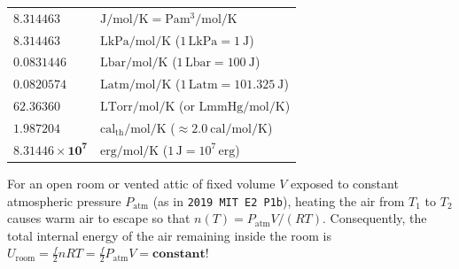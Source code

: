 \begin{twocol}[0.51]
\begin{shortcut}
\begin{tabularx}{\linewidth}{@{}l X@{}}
$\mathbf{8.314463}$ & $\si{\joule\per\mole\per\kelvin} = \si{\pascal\cubic\meter\per\mole\per\kelvin}$ \\
$\mathbf{8.314463}$ & $\si{\liter\kilo\pascal\per\mole\per\kelvin}$ ($1\,\si{\liter\kilo\pascal} = \SI{1}{\joule}$) \\
$\mathbf{0.0831446}$ & $\si{\liter\bar\per\mole\per\kelvin}$ ($1\,\si{\liter\bar} = \SI{100}{\joule}$) \\
$\mathbf{0.0820574}$ & $\si{\liter\text{atm}\per\mole\per\kelvin}$ ($1\,\si{\liter\text{atm}} = \SI{101.325}{\joule}$) \\
$\mathbf{62.36360}$ & $\si{\liter\text{Torr}\per\mole\per\kelvin}$ (or $\si{\liter\milli\meter\text{Hg}\per\mole\per\kelvin}$) \\
$\mathbf{1.987204}$ & $\si{\text{cal}_{\mathrm{th}}\per\mole\per\kelvin}$ ($\approx \SI{2.0}{\text{cal}\per\mole\per\kelvin}$) \\
$\mathbf{8.31446\times 10^7}$ & $\si{\text{erg}\per\mole\per\kelvin}$ ($1\,\si{\joule} = 10^7\,\si{\text{erg}}$) \\
\bottomrule
\end{tabularx}
\end{shortcut}
\begin{trapbox}
For an open room or vented attic of fixed volume $V$ exposed to constant atmospheric pressure $P_{\mathrm{atm}}$ (as in \texttt{2019 MIT E2 P1b}), heating the air from $T_1$ to $T_2$ causes warm air to escape so that $n(T) = P_{\mathrm{atm}}V/(RT)$. Consequently, the total internal energy of the air remaining inside the room is $U_{\mathrm{room}} = \frac{f}{2}nRT = \frac{f}{2}P_{\mathrm{atm}}V = \mathbf{\text{constant}}$!
\end{trapbox}
\end{twocol}

